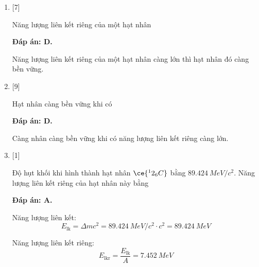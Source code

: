 \begin{enumerate}[label=\bfseries Câu \arabic*:]
{		Năng lượng liên kết riêng là năng lượng liên kết tính cho một nuclon.
		
	}
	\item {} [7]
	\cauhoi
	{Năng lượng liên kết riêng của một hạt nhân
	}
	
	\loigiai
	{		\textbf{Đáp án: D.}
		
		Năng lượng liên kết riêng của một hạt nhân càng lớn thì hạt nhân đó càng bền vững.
		
	}
	\item {} [9]
	\cauhoi
	{Hạt nhân càng bền vững khi có
	}
	
	\loigiai
	{		\textbf{Đáp án: D.}
		
		Càng nhân càng bền vững khi có năng lượng liên kết riêng càng lớn.
		
	}
	\item {} [1]
	\cauhoi
	{Độ hụt khối khi hình thành hạt nhân $\ce{^12_6 C}$ bằng $\SI{89.424}{MeV/c^2}$. Năng lượng liên kết riêng của hạt nhân này bằng
	}
	
	\loigiai
	{		\textbf{Đáp án: A.}
		
		Năng lượng liên kết:
		$$E_\text{lk} = \Delta m c^2 = \SI{89.424}{MeV/c^2} \cdot c^2 = \SI{89.424}{MeV}$$
		
		Năng lượng liên kết riêng:
		$$E_\text{lkr} = \dfrac{E_\text{lk}}{A} = \SI{7.452}{MeV}$$
		
}
\end{enumerate}
